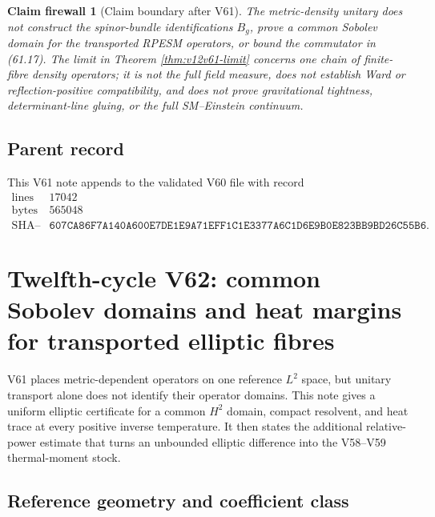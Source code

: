 \documentclass[11pt]{article}
\newtheorem{firewall}[theorem]{Claim firewall}
\theoremstyle{remark}
\begin{document}
\begin{firewall}[Claim boundary after V61]
\label{fire:v12v61-claim}
The metric-density unitary does not construct the spinor-bundle
identifications \(B_g\), prove a common Sobolev domain for the
transported RPESM operators, or bound the commutator in (61.17).
The limit in Theorem \ref{thm:v12v61-limit} concerns one chain of
finite-fibre density operators; it is not the full field measure,
does not establish Ward or reflection-positive compatibility, and
does not prove gravitational tightness, determinant-line gluing, or
the full SM--Einstein continuum.
\end{firewall}

\subsection{Parent record}

This V61 note appends to the validated V60 file with record
\[
\begin{array}{c|c}
\text{lines}&17042\\
\text{bytes}&565048\\
\text{SHA--256}&
\texttt{607CA86F7A140A600E7DE1E9A71EFF1C1E3377A6C1D6E9B0E823BB9BD26C55B6}.
\end{array}
\]


\section{Twelfth-cycle V62: common Sobolev domains and heat margins
for transported elliptic fibres}
\label{sec:v12v62}

V61 places metric-dependent operators on one reference \(L^2\)
space, but unitary transport alone does not identify their operator
domains.  This note gives a uniform elliptic certificate for a
common \(H^2\) domain, compact resolvent, and heat trace at every
positive inverse temperature.  It then states the additional
relative-power estimate that turns an unbounded elliptic difference
into the V58--V59 thermal-moment stock.

\subsection{Reference geometry and coefficient class}
\end{document}
